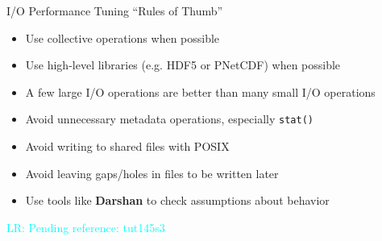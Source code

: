\documentclass[compress,11pt,xcolor=svgnames,aspectratio=169]{beamer}
\newcommand{\lr}[1]{\textcolor{cyan}{LR: #1}}
\begin{document}
\begin{frame}[fragile]{I/O Performance Tuning ``Rules of Thumb''}

\begin{itemize}
\setlength\itemsep{0.3cm}

  \item Use collective operations when possible

  \item Use high-level libraries (e.g. HDF5 or PNetCDF) when possible

  \item A few large I/O operations are better than many small I/O operations

  \item Avoid unnecessary metadata operations, especially \texttt{stat()}

  \item Avoid writing to shared files with POSIX

  \item Avoid leaving gaps/holes in files to be written later

  \item Use tools like \textbf{Darshan} to check assumptions about behavior

\end{itemize}

\lr{Pending reference: tut145s3}

\end{frame}
\end{document}
